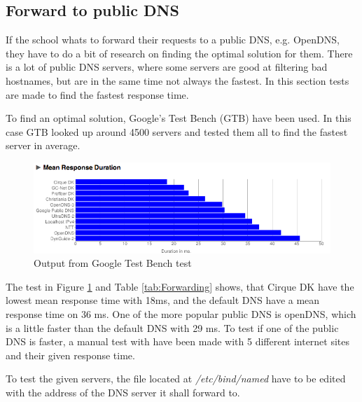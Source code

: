 \documentclass[Preamble]{subfiles}
\begin{document}
\subsection{Forward to public DNS}
If the school whats to forward their requests to a public DNS, e.g. OpenDNS, they have to do a bit of research on finding the optimal solution for them. 
There is a lot of public DNS servers, where some servers are good at filtering bad hostnames, but are in the same time not always the fastest. 
In this section tests are made to find the fastest response time.

To find an optimal solution, Google's Test Bench (GTB) have been used.
In this case GTB looked up around 4500 servers and tested them all to find the fastest server in average.

\begin{figure}[hbtp]
\centering
\includegraphics[scale=0.5]{Figurer/NamebenchTest.png}
\caption{Output from Google Test Bench test}
\label{fig:testBench}
\end{figure}

The test in Figure \ref{fig:testBench} and Table \ref{tab:Forwarding} shows, that Cirque DK have the lowest mean response time with 18ms, and the default DNS have a mean response time on 36 ms. 
One of the more popular public DNS is openDNS, which is a little faster than the default DNS with 29 ms. 
To test if one of the public DNS is faster, a manual test with  have been made with 5 different internet sites and their given response time. 

To test the given servers, the file located at \textit{/etc/bind/named} have to be edited with the address of the DNS server it shall forward to. 
\end{document}
